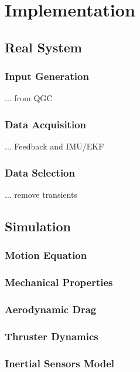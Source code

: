 \chapter{Implementation}
\label{chap:implementation}

\section{Real System}
\subsection{Input Generation}
... from QGC

\subsection{Data Acquisition}
... Feedback and IMU/EKF

\subsection{Data Selection}
... remove transients


\section{Simulation}
\subsection{Motion Equation}

\subsection{Mechanical Properties}

\subsection{Aerodynamic Drag}

\subsection{Thruster Dynamics}

\subsection{Inertial Sensors Model}

